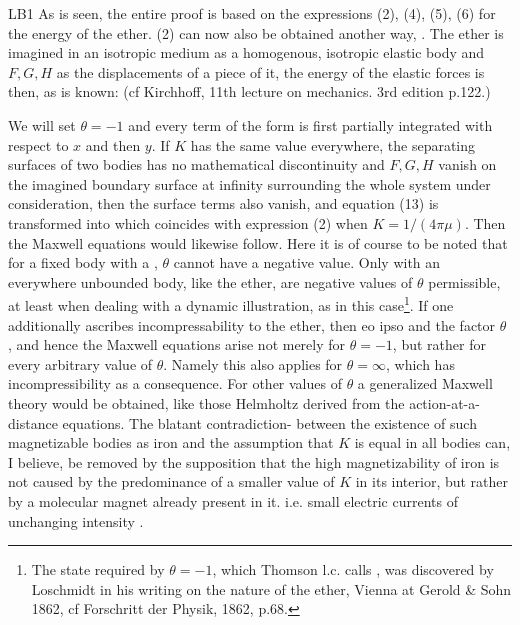 \begin{paper}{LB1}
As is seen, the entire proof is based on the expressions (2), (4), (5), (6) for the energy of the ether. (2) can now also be obtained another way, . The ether is imagined in an isotropic medium as a homogenous, isotropic elastic body and $F,G,H$ as the displacements of a piece of it, the energy of the elastic forces is then, as is known:
(cf Kirchhoff, 11th lecture on mechanics. 3rd edition p.122.)

We will set $\theta=-1$ and every term of the form
is first partially integrated with respect to $x$ and then $y$. If $K$ has the same value everywhere, the separating surfaces of two bodies has no mathematical discontinuity and $F,G,H$ vanish on the imagined boundary surface at infinity surrounding the whole system under consideration, then the surface terms also vanish, and equation (13) is transformed into
which coincides with expression (2) when $K=1/(4\pi\mu)$. Then the Maxwell equations would likewise follow. Here it is of course to be noted that for a fixed body with a , $\theta$ cannot have a negative value. Only with an everywhere unbounded body, like the ether, are negative values of $\theta$ permissible, at least when dealing with a dynamic illustration, as in this case\footnote{The state required by $\theta=-1$, which Thomson l.c. calls , was discovered by Loschmidt in his writing on the nature of the ether, Vienna at Gerold \& Sohn 1862, cf Forschritt der Physik, 1862, p.68.}. If one additionally ascribes incompressability to the ether, then eo ipso
and the factor $\theta$ ,  and hence the Maxwell equations arise not merely for $\theta = -1$, but rather for every arbitrary value of $\theta$. Namely this also applies for $\theta=\infty$, which has incompressibility as a consequence. For other values of $\theta$ a generalized Maxwell theory would be obtained, like those Helmholtz derived from the action-at-a-distance equations. The blatant contradiction-
between the existence of such magnetizable bodies as iron and the assumption that $K$ is equal in all bodies can, I believe, be removed by the supposition that the high magnetizability of iron is not caused by the predominance of a smaller value of $K$ in its interior, but rather by a molecular magnet already present in it. i.e. small electric currents of unchanging intensity .


\end{paper}
